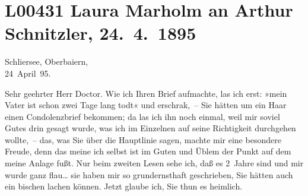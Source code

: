 

\section[Laura Marholm an Arthur Schnitzler, 24. 4. 1895]{L00431 Laura Marholm an Arthur Schnitzler, 24. 4. 1895}
\nopagebreak{}
\rehead{ }\normalsize\beginnumbering{}
\toendnotes[C]{\smallbreak\pagebreak[2]}
\toendnotes[C]{\smallbreak}
\toendnotes[C]{\smallbreak}
\pstart
           \raggedleft{}{\pb}Schliersee, Oberbaiern,{\\}24 April 95.\pend
           
\pstart{}Sehr geehrter Herr Doctor.\pend\vspace{0.5em}
\pstart
           Wie ich Ihren Brief aufmachte, las ich erst: »mein Vater ist schon zwei Tage lang todt« und erschrak, – Sie
               hätten um ein Haar einen Condolenzbrief bekommen; da las ich ihn noch einmal, weil
               mir soviel Gutes drin gesagt wurde, was ich im Einzelnen auf seine Richtigkeit
               durchgehen wollte, – das, was Sie über die Hauptlinie sagen, machte mir eine
               besondere Freude, denn das meine ich selbst ist im Guten und Üblem der Punkt auf dem
               meine Anlage fußt. Nur beim zweiten Lesen sehe ich, daß es 2 Jahre sind und mir wurde
               ganz flau{\dots} sie haben mir so grundernsthaft geschrieben,
               Sie hätten auch ein bischen lachen können. Jetzt glaube ich, Sie thun es
               heimlich.\pend
           
